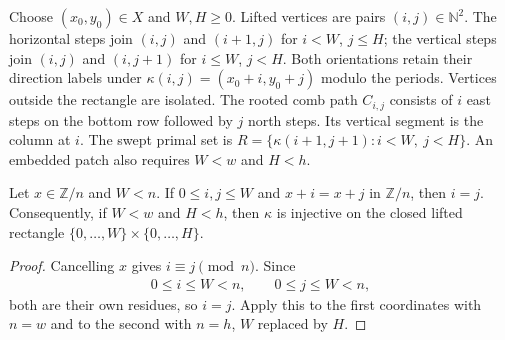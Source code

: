 
\begin{definition}%
    \label{def:peps_dual_rectangle_comb}
    \leanok
    Choose $(x_0,y_0)\in X$ and $W,H\geq0$.
    Lifted vertices are pairs $(i,j)\in\mathbb N^2$.
    The horizontal steps join $(i,j)$ and $(i+1,j)$ for $i<W$, $j\leq H$;
    the vertical steps join $(i,j)$ and $(i,j+1)$ for $i\leq W$, $j<H$.
    Both orientations retain their direction labels under
    $\kappa(i,j)=(x_0+i,y_0+j)$ modulo the periods.
    Vertices outside the rectangle are isolated.
    The rooted comb path $C_{i,j}$ consists of $i$ east steps on the
    bottom row followed by $j$ north steps. Its vertical segment is
    the column at $i$. The swept primal set is
    $R=\{\kappa(i+1,j+1):i<W,\ j<H\}$.
    An embedded patch also requires $W<w$ and $H<h$.
\end{definition}

\begin{lemma}%
    \label{thm:peps_dual_rectangle_injective}
    \leanok
    Let $x\in\mathbb Z/n$ and $W<n$. If $0\leq i,j\leq W$ and
    $x+i=x+j$ in $\mathbb Z/n$, then $i=j$. Consequently, if $W<w$ and
    $H<h$, then $\kappa$ is injective on the closed lifted rectangle
    $\{0,\ldots,W\}\times\{0,\ldots,H\}$.
\end{lemma}
\begin{proof}\leanok
    Cancelling $x$ gives $i\equiv j\pmod n$. Since
    \begin{align*}
        0\leq i\leq W<n, \qquad 0\leq j\leq W<n,
    \end{align*}
    both are their own residues, so $i=j$. Apply this to the first
    coordinates with $n=w$ and to the second with $n=h$, $W$ replaced by $H$.
\end{proof}

